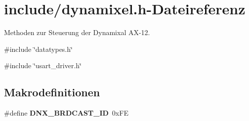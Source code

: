 \section{include/dynamixel.h-\/Dateireferenz}
\label{dynamixel_8h}


Methoden zur Steuerung der Dynamixal AX-\/12.  


{\ttfamily \#include \char`\"{}datatypes.h\char`\"{}}\par
{\ttfamily \#include \char`\"{}usart\_\-driver.h\char`\"{}}\par
\subsection*{Makrodefinitionen}
\begin{DoxyCompactItemize}
\item 
\#define {\bf DNX\_\-BRDCAST\_\-ID}~0xFE
\end{DoxyCompactItemize}
